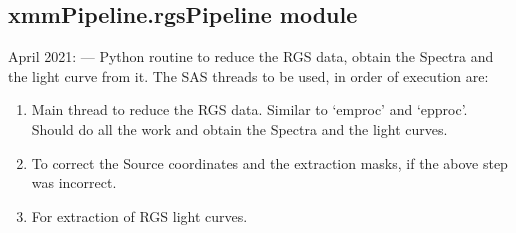 \documentclass[letterpaper,10pt,english]{sphinxmanual}
\begin{document}
\subsection{xmmPipeline.rgsPipeline module}
\label{\detokenize{xmmPipeline:module-xmmPipeline.rgsPipeline}}\label{\detokenize{xmmPipeline:xmmpipeline-rgspipeline-module}}
 April 2021:
—
Python routine to reduce the RGS data, obtain the Spectra and the light curve from it.
The SAS threads to be used, in order of execution are:
\begin{enumerate}
%
\item {} 
\sphinxAtStartPar
{}
Main thread to reduce the RGS data. Similar to ‘emproc’ and ‘epproc’.
Should do all the work and obtain the Spectra and the light curves.

\item {} 
\sphinxAtStartPar
{}
To correct the Source coordinates and the extraction masks, if the above
step was incorrect.

\item {} 
\sphinxAtStartPar
{}
For extraction of RGS light curves.

\end{enumerate}

\begin{fulllineitems}
\label{\detokenize{xmmPipeline:xmmPipeline.rgsPipeline.main}}
\pysigstartsignatures
{}
\pysigstopsignatures
\end{fulllineitems}


\begin{fulllineitems}
\label{\detokenize{xmmPipeline:xmmPipeline.rgsPipeline.printErrorMessage}}
\pysigstartsignatures
{}
\pysigstopsignatures
\end{fulllineitems}
\end{document}
